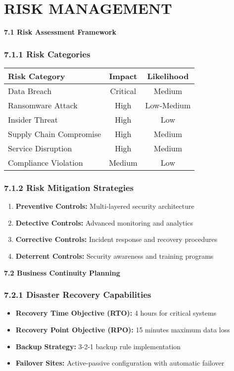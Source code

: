 \documentclass[12pt,a4paper]{report}
\newcommand{\sectionheader}[1]{\textbf{\color{govblue}#1}}
\begin{document}
\chapter{RISK MANAGEMENT}

\sectionheader{7.1 Risk Assessment Framework}

\subsection*{7.1.1 Risk Categories}
\begin{table}[h]
\centering
\begin{tabular}{@{}lcc@{}}
\toprule
\textbf{Risk Category} & \textbf{Impact} & \textbf{Likelihood} \\
\midrule
Data Breach & Critical & Medium \\
Ransomware Attack & High & Low-Medium \\
Insider Threat & High & Low \\
Supply Chain Compromise & High & Medium \\
Service Disruption & High & Medium \\
Compliance Violation & Medium & Low \\
\bottomrule
\end{tabular}
\end{table}

\subsection*{7.1.2 Risk Mitigation Strategies}
\begin{enumerate}[leftmargin=*, itemsep=4pt]
    \item \textbf{Preventive Controls:} Multi-layered security architecture
    \item \textbf{Detective Controls:} Advanced monitoring and analytics
    \item \textbf{Corrective Controls:} Incident response and recovery procedures
    \item \textbf{Deterrent Controls:} Security awareness and training programs
\end{enumerate}

\sectionheader{7.2 Business Continuity Planning}

\subsection*{7.2.1 Disaster Recovery Capabilities}
\begin{itemize}[leftmargin=*, itemsep=3pt]
    \item \textbf{Recovery Time Objective (RTO):} 4 hours for critical systems
    \item \textbf{Recovery Point Objective (RPO):} 15 minutes maximum data loss
    \item \textbf{Backup Strategy:} 3-2-1 backup rule implementation
    \item \textbf{Failover Sites:} Active-passive configuration with automatic failover
\end{itemize}
\end{document}
